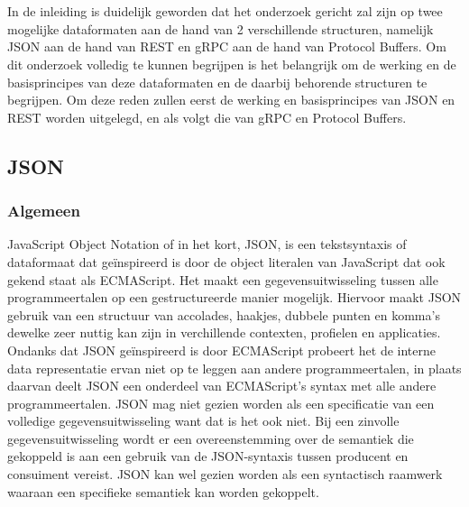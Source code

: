 \chapter{}
\label{ch:stand-van-zaken}



In de inleiding is duidelijk geworden dat het onderzoek gericht zal zijn op twee mogelijke dataformaten aan de hand van 2 verschillende structuren, namelijk JSON aan de hand van REST en gRPC aan de hand van Protocol Buffers. Om dit onderzoek volledig te kunnen begrijpen is het belangrijk om de werking en de basisprincipes van deze dataformaten en de daarbij behorende structuren te begrijpen. Om deze reden zullen eerst de werking en basisprincipes van JSON en REST worden uitgelegd, en als volgt die van gRPC en Protocol Buffers.

\section{JSON}
\label{sec:JSON}

\subsection{Algemeen}
\label{subsec:Algemeen}

JavaScript Object Notation of in het kort, JSON, is een tekstsyntaxis of dataformaat dat geïnspireerd is door de object literalen van JavaScript dat ook gekend staat als ECMAScript. Het maakt een gegevensuitwisseling tussen alle programmeertalen op een gestructureerde manier mogelijk. Hiervoor maakt JSON gebruik van een structuur van accolades, haakjes, dubbele punten en komma's dewelke zeer nuttig kan zijn in verchillende contexten, profielen en applicaties. Ondanks dat JSON geïnspireerd is door ECMAScript probeert het de interne data representatie ervan niet op te leggen aan andere programmeertalen, in plaats daarvan deelt JSON een onderdeel van ECMAScript's syntax met alle andere programmeertalen. JSON mag niet gezien worden als een specificatie van een volledige gegevensuitwisseling want dat is het ook niet. Bij een zinvolle gegevensuitwisseling wordt er een overeenstemming over de semantiek die gekoppeld is aan een gebruik van de JSON-syntaxis tussen producent en consuiment vereist. JSON kan wel gezien worden als een syntactisch raamwerk waaraan een specifieke semantiek kan worden gekoppelt.

